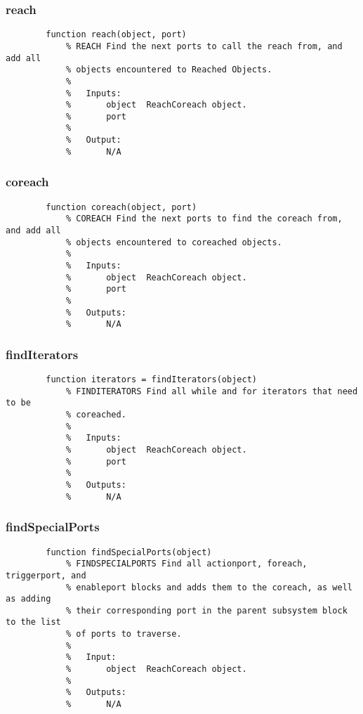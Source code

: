\documentclass[12pt,letterpaper]{report}
\begin{document}
		\subsubsection{reach}
\begin{lstlisting}
        function reach(object, port)
            % REACH Find the next ports to call the reach from, and add all
            % objects encountered to Reached Objects.
            %
            %   Inputs:
            %       object  ReachCoreach object.
            %       port
            %
            %   Output:
            %       N/A
\end{lstlisting}
		
		\subsubsection{coreach}
\begin{lstlisting}
        function coreach(object, port)
            % COREACH Find the next ports to find the coreach from, and add all
            % objects encountered to coreached objects.
            %
            %   Inputs:
            %       object  ReachCoreach object.
            %       port
            %
            %   Outputs:
            %       N/A
\end{lstlisting}
		
		\subsubsection{findIterators}
\begin{lstlisting}
        function iterators = findIterators(object)
            % FINDITERATORS Find all while and for iterators that need to be
            % coreached.
            %
            %   Inputs:
            %       object  ReachCoreach object.
            %       port
            %
            %   Outputs:
            %       N/A
\end{lstlisting}
		
		\subsubsection{findSpecialPorts}
\begin{lstlisting}
        function findSpecialPorts(object)
            % FINDSPECIALPORTS Find all actionport, foreach, triggerport, and
            % enableport blocks and adds them to the coreach, as well as adding
            % their corresponding port in the parent subsystem block to the list
            % of ports to traverse.
            %
            %   Input:
            %       object  ReachCoreach object.
            %
            %   Outputs:
            %       N/A
\end{lstlisting}
		
\end{document}

